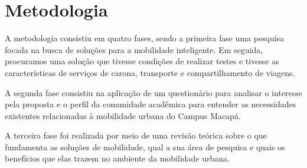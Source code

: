 \section{Metodologia}
A metodologia consistiu em quatro fases, sendo a primeira fase uma pesquisa focada na busca de soluções para a mobilidade inteligente. Em seguida, procuramos uma solução que tivesse condições de realizar testes e tivesse as características de serviços de carona, transporte e compartilhamento de viagens.

A segunda fase consistiu na aplicação de um questionário para analisar o interesse pela proposta e o perfil da comunidade acadêmica para entender as necessidades existentes relacionadas à mobilidade urbana do Campus Macapá.

A terceira fase foi realizada por meio de uma revisão teórica sobre o que fundamenta as soluções de mobilidade, qual a sua área de pesquisa e quais os benefícios que elas trazem no ambiente da mobilidade urbana.

\begin{comment}

A metodologia foi composta de quatro fases, onde a primeira é constituída da aplicação de um questionário para analisar o interesse em relação a proposta e o perfil da comunidade acadêmica, buscando entender quais as necessidades existentes relacionadas a Mobilidade Urbana do Campus Macapá.

A segunda fase realizou-se mediante revisão teórica sobre o que fundamenta soluções de mobilidade, qual é a sua área de estudo e o que trazem de benefícios no ambiente de Mobilidade Urbana.

Na terceira fase foi realizada uma pesquisa na qual o objetivo foi encontrar soluções de Mobilidade Inteligente. Após, buscamos pela solução que apresentasse condições para que pudéssemos realizar testes e que tivesse características de serviços de caronas, transporte e compartilhamento de viagens. 
\end{comment}

